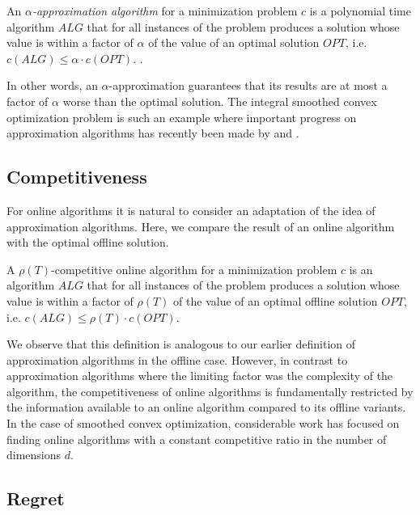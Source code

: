 \begin{definition}
An \textit{$\alpha$-approximation algorithm} for a minimization problem $c$ is a polynomial time algorithm $ALG$ that for all instances of the problem produces a solution whose value is within a factor of $\alpha$ of the value of an optimal solution $OPT$, i.e. $c(ALG) \leq \alpha \cdot c(OPT)$. \cite{Williamson2011}.
\end{definition}

In other words, an $\alpha$-approximation guarantees that its results are at most a factor of $\alpha$ worse than the optimal solution. The integral smoothed convex optimization problem is such an example where important progress on approximation algorithms has recently been made by \citeauthor*{Kappelmann2017} and \citeauthor*{Albers2021_2} \cite{Kappelmann2017, Albers2021_2}.

\subsection{Competitiveness}

For online algorithms it is natural to consider an adaptation of the idea of approximation algorithms. Here, we compare the result of an online algorithm with the optimal offline solution.

\begin{definition}
A $\rho(T)$-competitive online algorithm for a minimization problem $c$ is an algorithm $ALG$ that for all instances of the problem produces a solution whose value is within a factor of $\rho(T)$ of the value of an optimal offline solution $OPT$, i.e. $c(ALG) \leq \rho(T) \cdot c(OPT)$.
\end{definition}

We observe that this definition is analogous to our earlier definition of approximation algorithms in the offline case. However, in contrast to approximation algorithms where the limiting factor was the complexity of the algorithm, the competitiveness of online algorithms is fundamentally restricted by the information available to an online algorithm compared to its offline variants. In the case of smoothed convex optimization, considerable work has focused on finding online algorithms with a constant competitive ratio in the number of dimensions $d$.

\subsection{Regret}

